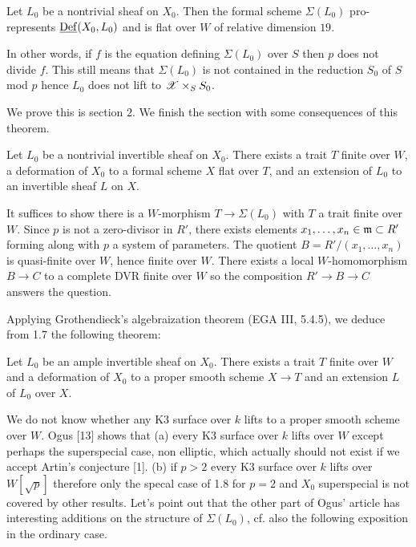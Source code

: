 \documentclass[12pt]{article}
\newcommand{\Def}{\mathrm{Def}}
\begin{document}
\begin{theorem}[A]
Let $L_0$ be a nontrivial sheaf on $X_0$. Then the formal scheme $\Sigma(L_0)$ pro-represents $\ul{\Def}(X_0, L_0)$ and is flat over $W$ of relative dimension $19$.
\end{theorem}

In other words, if $f$ is the equation defining $\Sigma(L_0)$ over $S$ then $p$ does not divide $f$. This still means that $\Sigma(L_0)$ is not contained in the reduction $S_0$ of $S$ mod $p$ hence $L_0$ does not lift to $\mathscr{X} \times_S S_0$.
\par 
We prove this is section $2$. We finish the section with some consequences of this theorem.

\begin{cor}
Let $L_0$ be a nontrivial invertible sheaf on $X_0$. There exists a trait $T$ finite over $W$, a deformation of $X_0$ to a formal scheme $X$ flat over $T$, and an extension of $L_0$ to an invertible sheaf $L$ on $X$.
\end{cor}


It suffices to show there is a $W$-morphism $T \to \Sigma(L_0)$ with $T$ a trait finite over $W$. Since $p$ is not a zero-divisor in $R'$, there exists elements $x_1, \dots, x_n \in \mathfrak{m} \subset R'$ forming along with $p$ a system of parameters. The quotient $B = R'/(x_1, \dots, x_n)$ is quasi-finite over $W$, hence finite over $W$. There exists a local $W$-homomorphism $B \to C$ to a complete DVR finite over $W$ so the composition $R' \to B \to C$ answers the question.
\par 
Applying Grothendieck's algebraization theorem (EGA III, 5.4.5), we deduce from 1.7 the following theorem:

\begin{cor}
Let $L_0$ be an ample invertible sheaf on $X_0$. There exists a trait $T$ finite over $W$ and a deformation of $X_0$ to a proper smooth scheme $X \to T$ and an extension $L$ of $L_0$ over $X$.
\end{cor}

\begin{rmk}
We do not know whether any K3 surface over $k$ lifts to a proper smooth scheme over $W$. Ogus [13] shows that (a) every K3 surface over $k$ lifts over $W$ except perhaps the superspecial case, non elliptic, which actually should not exist if we accept Artin's conjecture [1]. (b) if $p > 2$ every K3 surface over $k$ lifts over $W[\sqrt{p}]$ therefore only the specal case of 1.8 for $p = 2$ and $X_0$ superspecial is not covered by other results. Let's point out that the other part of Ogus' article has interesting additions on the structure of $\Sigma(L_0)$, cf. also the following exposition in the ordinary case.
\end{rmk}
\end{document}
